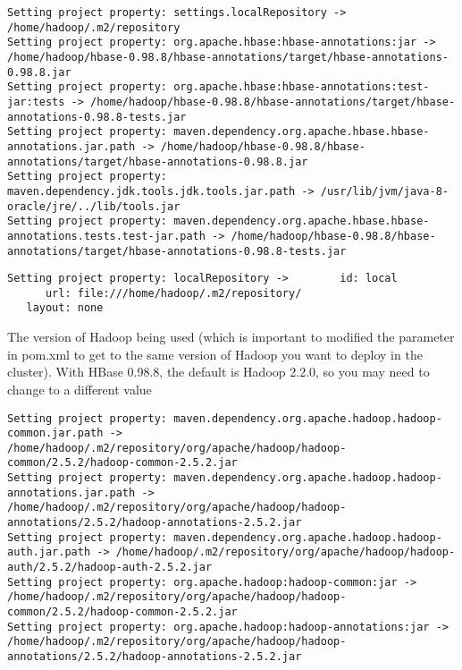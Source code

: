 \begin{verbatim}
Setting project property: settings.localRepository -> /home/hadoop/.m2/repository
Setting project property: org.apache.hbase:hbase-annotations:jar -> /home/hadoop/hbase-0.98.8/hbase-annotations/target/hbase-annotations-0.98.8.jar
Setting project property: org.apache.hbase:hbase-annotations:test-jar:tests -> /home/hadoop/hbase-0.98.8/hbase-annotations/target/hbase-annotations-0.98.8-tests.jar
Setting project property: maven.dependency.org.apache.hbase.hbase-annotations.jar.path -> /home/hadoop/hbase-0.98.8/hbase-annotations/target/hbase-annotations-0.98.8.jar
Setting project property: maven.dependency.jdk.tools.jdk.tools.jar.path -> /usr/lib/jvm/java-8-oracle/jre/../lib/tools.jar
Setting project property: maven.dependency.org.apache.hbase.hbase-annotations.tests.test-jar.path -> /home/hadoop/hbase-0.98.8/hbase-annotations/target/hbase-annotations-0.98.8-tests.jar

\end{verbatim}

\begin{verbatim}
Setting project property: localRepository ->        id: local
      url: file:///home/hadoop/.m2/repository/
   layout: none
\end{verbatim}

The version of Hadoop being used (which is important to modified the parameter
in pom.xml to get to the same version of Hadoop you want to deploy in the
cluster). With HBase 0.98.8, the default is Hadoop 2.2.0, so you may need to
change to a different value
\begin{verbatim}
Setting project property: maven.dependency.org.apache.hadoop.hadoop-common.jar.path -> /home/hadoop/.m2/repository/org/apache/hadoop/hadoop-common/2.5.2/hadoop-common-2.5.2.jar
Setting project property: maven.dependency.org.apache.hadoop.hadoop-annotations.jar.path -> /home/hadoop/.m2/repository/org/apache/hadoop/hadoop-annotations/2.5.2/hadoop-annotations-2.5.2.jar
Setting project property: maven.dependency.org.apache.hadoop.hadoop-auth.jar.path -> /home/hadoop/.m2/repository/org/apache/hadoop/hadoop-auth/2.5.2/hadoop-auth-2.5.2.jar
Setting project property: org.apache.hadoop:hadoop-common:jar -> /home/hadoop/.m2/repository/org/apache/hadoop/hadoop-common/2.5.2/hadoop-common-2.5.2.jar
Setting project property: org.apache.hadoop:hadoop-annotations:jar -> /home/hadoop/.m2/repository/org/apache/hadoop/hadoop-annotations/2.5.2/hadoop-annotations-2.5.2.jar
\end{verbatim}


